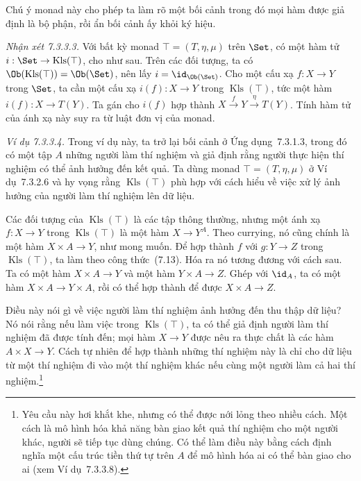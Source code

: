 Chú ý monad này cho phép ta làm rõ một bối cảnh trong đó mọi hàm được giả định là bộ phận, rồi ẩn bối cảnh ấy khỏi ký hiệu.

\noindent\textit{Nhận xét 7.3.3.3.}\keepwithnext
Với bất kỳ monad $\top=(T,\eta,\mu)$ trên $\Set$, có một hàm tử $i:\Set\to\operatorname{Kls}(\top)$, cho như sau. Trên các đối tượng, ta có $\Ob(\operatorname{Kls}(\top))=\Ob(\Set)$, nên lấy $i=\id_{\Ob(\Set)}$. Cho một cấu xạ $f:X\to Y$ trong $\Set$, ta cần một cấu xạ $i(f):X\to Y$ trong $\operatorname{Kls}(\top)$, tức một hàm $i(f):X\to T(Y)$. Ta gán cho $i(f)$ hợp thành $X\xrightarrow{f}Y\xrightarrow{\eta}T(Y)$. Tính hàm tử của ánh xạ này suy ra từ luật đơn vị của monad.

\noindent\textit{Ví dụ 7.3.3.4.}\keepwithnext
Trong ví dụ này, ta trở lại bối cảnh ở Ứng dụng~7.3.1.3, trong đó có một tập $A$ những người làm thí nghiệm và giả định rằng người thực hiện thí nghiệm có thể ảnh hưởng đến kết quả. Ta dùng monad $\top=(T,\eta,\mu)$ ở Ví dụ~7.3.2.6 và hy vọng rằng $\operatorname{Kls}(\top)$ phù hợp với cách hiểu về việc xử lý ảnh hưởng của người làm thí nghiệm lên dữ liệu.

Các đối tượng của $\operatorname{Kls}(\top)$ là các tập thông thường, nhưng một ánh xạ $f:X\to Y$ trong $\operatorname{Kls}(\top)$ là một hàm $X\to Y^A$. Theo currying, nó cũng chính là một hàm $X\times A\to Y$, như mong muốn. Để hợp thành $f$ với $g:Y\to Z$ trong $\operatorname{Kls}(\top)$, ta làm theo công thức~(7.13). Hóa ra nó tương đương với cách sau. Ta có một hàm $X\times A\to Y$ và một hàm $Y\times A\to Z$. Ghép với $\id_A$, ta có một hàm $X\times A\to Y\times A$, rồi có thể hợp thành để được $X\times A\to Z$.

Điều này nói gì về việc người làm thí nghiệm ảnh hưởng đến thu thập dữ liệu? Nó nói rằng nếu làm việc trong $\operatorname{Kls}(\top)$, ta có thể giả định người làm thí nghiệm đã được tính đến; mọi hàm $X\to Y$ được nêu ra thực chất là các hàm $A\times X\to Y$. Cách tự nhiên để hợp thành những thí nghiệm này là chỉ cho dữ liệu từ một thí nghiệm đi vào một thí nghiệm khác nếu cùng một người làm cả hai thí nghiệm.\footnote{Yêu cầu này hơi khắt khe, nhưng có thể được nới lỏng theo nhiều cách. Một cách là mô hình hóa khả năng bàn giao kết quả thí nghiệm cho một người khác, người sẽ tiếp tục dùng chúng. Có thể làm điều này bằng cách định nghĩa một cấu trúc tiền thứ tự trên $A$ để mô hình hóa ai có thể bàn giao cho ai (xem Ví dụ~7.3.3.8).}

